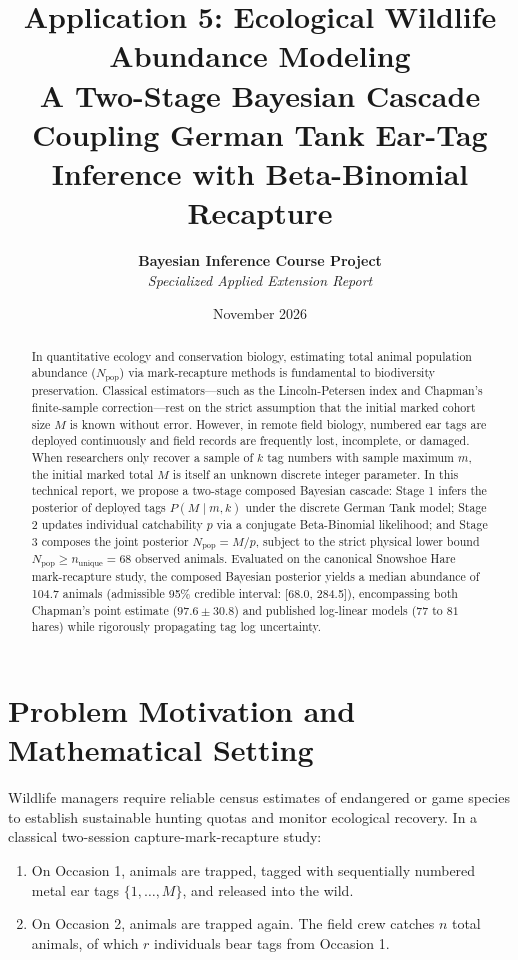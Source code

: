 \documentclass[11pt,a4paper]{article}
\title{\textbf{\Large Application 5: Ecological Wildlife Abundance Modeling}\\
\large A Two-Stage Bayesian Cascade Coupling German Tank Ear-Tag Inference with Beta-Binomial Recapture}
\author{\textbf{Bayesian Inference Course Project} \\
\textit{Specialized Applied Extension Report}}
\date{November 2026}
\begin{document}
\maketitle

\begin{abstract}
In quantitative ecology and conservation biology, estimating total animal population abundance ($N_{\text{pop}}$) via mark-recapture methods is fundamental to biodiversity preservation. Classical estimators---such as the Lincoln-Petersen index and Chapman's finite-sample correction---rest on the strict assumption that the initial marked cohort size $M$ is known without error. However, in remote field biology, numbered ear tags are deployed continuously and field records are frequently lost, incomplete, or damaged. When researchers only recover a sample of $k$ tag numbers with sample maximum $m$, the initial marked total $M$ is itself an unknown discrete integer parameter. In this technical report, we propose a two-stage composed Bayesian cascade: Stage 1 infers the posterior of deployed tags $P(M \mid m, k)$ under the discrete German Tank model; Stage 2 updates individual catchability $p$ via a conjugate Beta-Binomial likelihood; and Stage 3 composes the joint posterior $N_{\text{pop}} = M / p$, subject to the strict physical lower bound $N_{\text{pop}} \ge n_{\text{unique}} = 68$ observed animals. Evaluated on the canonical Snowshoe Hare mark-recapture study, the composed Bayesian posterior yields a median abundance of 104.7 animals (admissible 95\% credible interval: [68.0, 284.5]), encompassing both Chapman's point estimate ($97.6 \pm 30.8$) and published log-linear models ($77$ to $81$ hares) while rigorously propagating tag log uncertainty.
\end{abstract}

\section{Problem Motivation and Mathematical Setting}

Wildlife managers require reliable census estimates of endangered or game species to establish sustainable hunting quotas and monitor ecological recovery. In a classical two-session capture-mark-recapture study:
\begin{enumerate}
    \item On Occasion 1, animals are trapped, tagged with sequentially numbered metal ear tags $\{1, \dots, M\}$, and released into the wild.
    \item On Occasion 2, animals are trapped again. The field crew catches $n$ total animals, of which $r$ individuals bear tags from Occasion 1.
\end{enumerate}
\end{document}

